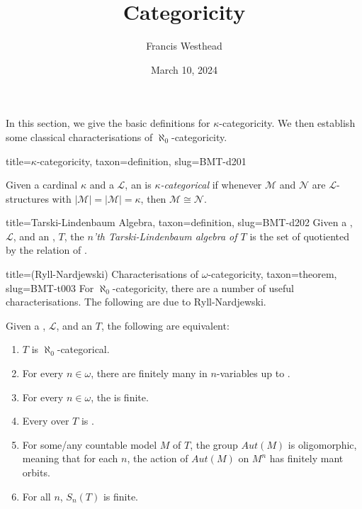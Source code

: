 \documentclass[a4paper]{article}
\title{Categoricity}
\date{March 10, 2024}
\author{Francis Westhead}
\begin{document}
\maketitle
\par{In this section, we give the basic definitions for \(\kappa\)-categoricity. We then establish some classical characterisations of \(\aleph _0\)-categoricity.}
\begin{tree}{title={\(\kappa\)-categoricity}, taxon={definition}, slug={BMT-d201}}

    Given a cardinal \(\kappa\) and a  \(\mathcal {L}\), an  is \emph{\(\kappa\)-categorical} if whenever \(\mathcal {M}\) and \(\mathcal {N}\) are \(\mathcal {L}\)-structures with \(| \mathcal {M}|=| \mathcal {M}|= \kappa\), then \(\mathcal {M}  \cong   \mathcal {N}\). 

\end{tree}

\begin{tree}{title={Tarski-Lindenbaum Algebra}, taxon={definition}, slug={BMT-d202}}
Given a , \(\mathcal {L}\), and an , \(T\), the \emph{\(n\)'th Tarski-Lindenbaum algebra of \(T\)} is the set of  quotiented by the relation of .
\end{tree}

\begin{tree}{title={(Ryll-Nardjewski) Characterisations of \(\omega\)-categoricity}, taxon={theorem}, slug={BMT-t003}}
For \(\aleph _0\)-categoricity, there are a number of useful characterisations. The following are due to Ryll-Nardjewski.\par{Given a , \(\mathcal {L}\), and an  \(T\), the following are equivalent:}\par{\begin{enumerate}
\item{\(T\) is \(\aleph _0\)-categorical.
    }
   \item{
        For every \(n \in   \omega\), there are finitely many  in \(n\)-variables up to .
   }
    \item{
        For every \(n \in   \omega\), the  is finite. 
    }
    \item{
        Every  over \(T\) is . 
    }
    \item{
        For some/any countable model \(M\) of \(T\), the  group \(Aut(M)\) is oligomorphic, meaning that for each \(n\), the action of \(Aut(M)\) on \(M^n\) has finitely mant orbits.
    }
    \item{
        For all \(n\), \(S_n(T)\) is finite.
    }
\end{enumerate}}
\end{tree}

\printbibliography
\end{document}
